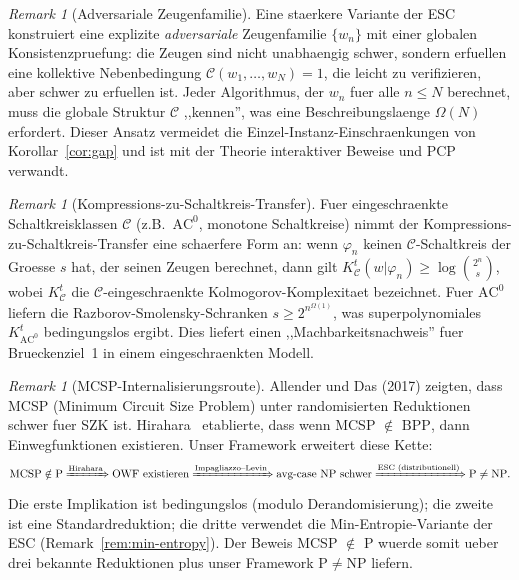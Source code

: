 \documentclass[aps,prd,twocolumn,superscriptaddress,nofootinbib]{revtex4-2}
\theoremstyle{definition}
\theoremstyle{remark}
\newtheorem{remark}[theorem]{Remark}
\newcommand{\NP}{\mathrm{NP}}
\newcommand{\PP}{\mathrm{P}}
\newcommand{\BPP}{\mathrm{BPP}}
\begin{document}
\begin{remark}[Adversariale Zeugenfamilie]
\label{rem:adversarial-witness}
Eine staerkere Variante der ESC konstruiert eine explizite \emph{adversariale} Zeugenfamilie $\{w_n\}$ mit einer globalen Konsistenzpruefung: die Zeugen sind nicht unabhaengig schwer, sondern erfuellen eine kollektive Nebenbedingung $\mathcal{C}(w_1, \ldots, w_N) = 1$, die leicht zu verifizieren, aber schwer zu erfuellen ist. Jeder Algorithmus, der $w_n$ fuer alle $n \leq N$ berechnet, muss die globale Struktur $\mathcal{C}$ ,,kennen'', was eine Beschreibungslaenge $\Omega(N)$ erfordert. Dieser Ansatz vermeidet die Einzel-Instanz-Einschraenkungen von Korollar~\ref{cor:gap} und ist mit der Theorie interaktiver Beweise und PCP verwandt.
\end{remark}

\begin{remark}[Kompressions-zu-Schaltkreis-Transfer]
\label{rem:compression-circuit}
Fuer eingeschraenkte Schaltkreisklassen $\mathcal{C}$ (z.B.\ $\mathrm{AC}^0$, monotone Schaltkreise) nimmt der Kompressions-zu-Schaltkreis-Transfer eine schaerfere Form an: wenn $\varphi_n$ keinen $\mathcal{C}$-Schaltkreis der Groesse $s$ hat, der seinen Zeugen berechnet, dann gilt $K^t_{\mathcal{C}}(w | \varphi_n) \geq \log \binom{2^n}{s}$, wobei $K^t_{\mathcal{C}}$ die $\mathcal{C}$-eingeschraenkte Kolmogorov-Komplexitaet bezeichnet. Fuer $\mathrm{AC}^0$ liefern die Razborov-Smolensky-Schranken $s \geq 2^{n^{\Omega(1)}}$, was superpolynomiales $K^t_{\mathrm{AC}^0}$ bedingungslos ergibt. Dies liefert einen ,,Machbarkeitsnachweis'' fuer Brueckenziel~1 in einem eingeschraenkten Modell.
\end{remark}

\begin{remark}[MCSP-Internalisierungsroute]
\label{rem:mcsp-internalisation}
Allender und Das (2017) zeigten, dass MCSP (Minimum Circuit Size Problem) unter randomisierten Reduktionen schwer fuer SZK ist. Hirahara~\cite{Hirahara2018} etablierte, dass wenn MCSP $\notin$ $\BPP$, dann Einwegfunktionen existieren. Unser Framework erweitert diese Kette:
\[
\text{MCSP} \notin \text{P} \xRightarrow{\text{Hirahara}} \text{OWF existieren} \xRightarrow{\text{Impagliazzo--Levin}} \text{avg-case NP schwer} \xRightarrow{\text{ESC (distributionell)}} \text{P} \neq \text{NP}.
\]
Die erste Implikation ist bedingungslos (modulo Derandomisierung); die zweite ist eine Standardreduktion; die dritte verwendet die Min-Entropie-Variante der ESC (Remark~\ref{rem:min-entropy}). Der Beweis MCSP $\notin$ $\PP$ wuerde somit ueber drei bekannte Reduktionen plus unser Framework $\PP \neq \NP$ liefern.
\end{remark}
\end{document}
